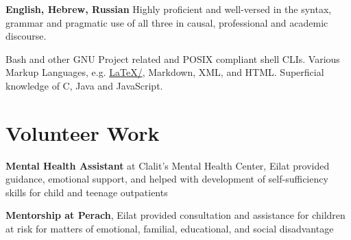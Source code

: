 {\textbf{English, Hebrew, Russian}}
{Highly proficient and well-versed in the syntax, grammar and pragmatic use of all three in causal, professional and academic discourse.}
{}

{Bash and other GNU Project related and POSIX compliant shell CLIs. Various Markup Languages, e.g. \href{https://github.com/kiril-u/cv/}{\LaTeX/\XeTeX}, Markdown, XML, and HTML. Superficial knowledge of C, Java and JavaScript.}
{}

\section{Volunteer Work}

{\textbf{Mental Health Assistant} at Clalit's Mental Health Center, Eilat}
{provided guidance, emotional support, and helped with development of self-sufficiency skills for child and teenage outpatients}
{}

{\textbf{Mentorship at Perach}, Eilat}
{provided consultation and assistance for children at risk for matters of emotional, familial, educational, and social disadvantage}
{} 
\unsetLTR
